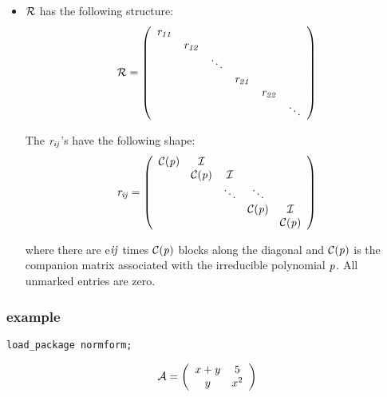 \begin{itemize}
\item ${\cal R}$ has the following structure:
      \begin{displaymath}
      {\cal R} = \left( \begin{array}{cccccc} {\it r_{11}} \\  & 
      {\it r_{12}} \\  &  & \ddots \\  &  &  & {\it r_{21}}  \\ &  &  
      &  & {\it r_{22}} \\ &  &  &  &  & \ddots \end{array} \right) 
      \end{displaymath}

      The ${\it r_{ij}}$'s have the following shape:  
      \begin{displaymath}
      {\it r_{ij}} = \left( \begin{array}{ccccc} {\cal C}({\it p}) & 
      {\cal I}  &  &  & \\  &  {\cal C}({\it p}) & {\cal I}  & & \\ & 
      & \ddots & \ddots & \\ &  &  &  {\cal C}({\it p}) & {\cal I} \\ &
      &  &  & {\cal C}({\it p}) \end{array} \right) 
      \end{displaymath}

      where there are e${\it ij}$ times ${\cal C}({\it p})$ blocks 
      along the diagonal and ${\cal C}({\it p})$ is the companion 
      matrix  associated with the irreducible polynomial ${\it p}$. All 
      unmarked entries are zero.
\end{itemize}

\subsubsection{example}

{\tt load\_package normform;}

\begin{displaymath}
{\cal A} = \left( \begin{array}{cc} x+y & 5 \\ y & x^2  \end{array} 
\right)
\end{displaymath}

